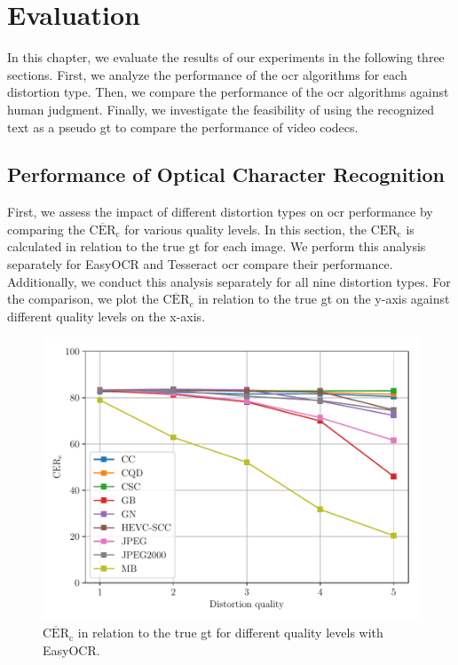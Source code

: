 \chapter{Evaluation}
\label{chap:evaluation}

In this chapter, we evaluate the results of our experiments in the following three sections.
First, we analyze the performance of the \gls{ocr} algorithms for each distortion type.
Then, we compare the performance of the \gls{ocr} algorithms against human judgment.
Finally, we investigate the feasibility of using the recognized text as a pseudo \gls{gt} to compare the performance of video codecs.

\section{Performance of Optical Character Recognition}
\label{sec:ocr_performance}

First, we assess the impact of different distortion types on \gls{ocr} performance by comparing the $\overline{\text{CER}}_{\text{c}}$ for various quality levels.
In this section, the $\text{CER}_{\text{c}}$ is calculated in relation to the true \gls{gt} for each image.
We perform this analysis separately for EasyOCR and Tesseract \gls{ocr} compare their performance.
Additionally, we conduct this analysis separately for all nine distortion types.
For the comparison, we plot the $\overline{\text{CER}}_{c}$ in relation to the true \gls{gt} on the y-axis against different quality levels on the x-axis.

\begin{figure}[h!]
\centering
    \includegraphics[width=\textwidth]{../../images/analyze/cer_dist_quality_gt_ezocr.pdf}
    \caption{$\overline{\text{CER}}_{\text{c}}$ in relation to the true \gls{gt} for different quality levels with EasyOCR.}
\label{fig:cer_dist_quality_gt_ezocr}
\end{figure}

